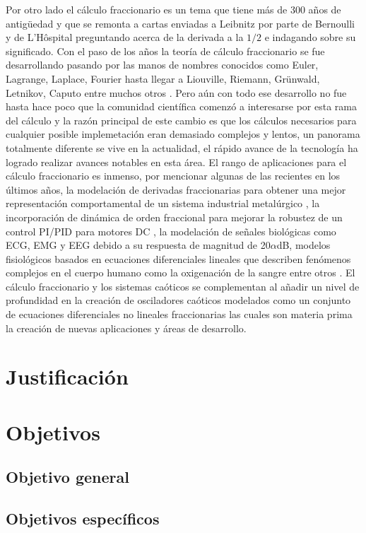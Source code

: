 	Por otro lado el cálculo fraccionario es un tema que tiene más de 300 años de antigüedad y que se remonta a cartas enviadas a Leibnitz por parte de Bernoulli y de L'Hôspital preguntando acerca de la derivada a la $1/2$ e indagando sobre su significado. Con el paso de los años la teoría de cálculo fraccionario se fue desarrollando pasando por las manos de nombres conocidos como Euler, Lagrange, Laplace, Fourier hasta llegar a Liouville, Riemann, Grünwald, Letnikov, Caputo entre muchos otros \cite{Petras2011}. Pero aún con todo ese desarrollo no fue hasta hace poco que la comunidad científica comenzó a interesarse por esta rama del cálculo y la razón principal de este cambio es que los cálculos necesarios para cualquier posible implemetación eran demasiado complejos y lentos, un panorama totalmente diferente se vive en la actualidad, el rápido avance de la tecnología ha logrado realizar avances notables en esta área. El rango de aplicaciones para el cálculo fraccionario es inmenso, por mencionar algunas de las recientes en los últimos años, la modelación de derivadas fraccionarias para obtener una mejor representación comportamental de un sistema industrial metalúrgico \cite{Petras2019}, la incorporación de dinámica de orden fraccional para mejorar la robustez de un control PI/PID para motores DC \cite{Tepljakov2016,Khubalkar2018}, la modelación de señales biológicas como ECG, EMG y EEG debido a su respuesta de magnitud de 20$\alpha$dB, modelos fisiológicos basados en ecuaciones diferenciales lineales que describen fenómenos complejos en el cuerpo humano como la oxigenación de la sangre entre otros \cite{Ortigueira2011}.
	El cálculo fraccionario y los sistemas caóticos se complementan al añadir un nivel de profundidad en la creación de osciladores caóticos modelados como un conjunto de ecuaciones diferenciales no lineales fraccionarias las cuales son materia prima la creación de nuevas aplicaciones y áreas de desarrollo. 
	
	\section{Justificación}
	
	\section{Objetivos}
	
		\subsection{Objetivo general}
		
		\subsection{Objetivos específicos}
	